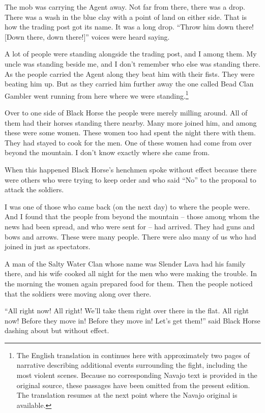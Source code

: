 The mob was carrying the Agent away. Not far from there, there was a drop. There was a wash in the blue clay with a point of land on either side. That is how the trading post got its name. It was a long drop.
``Throw him down there! [Down there, down there!]'' voices were heard saying.

A lot of people were standing alongside the trading post, and I among them. My uncle was standing beside me, and I don't remember who else was standing there. As the people carried the Agent along they beat him with their fists. They were beating him up. But as they carried him further away the one called Bead Clan Gambler went running from here where we were standing.\footnote{The English translation in \citet[27-29]{Young:1952cy} continues here with approximately two pages of narrative describing additional events surrounding the fight, including the most violent scenes. Because no corresponding Navajo text is provided in the original source, these passages have been omitted from the present edition. The translation resumes at the next point where the Navajo original is available.}

Over to one side of Black Horse the people were merely milling around. All of them had their horses standing there nearby. Many more joined him, and among these were some women. These women too had spent the night there with them. They had stayed to cook for the men. One of these women had come from over beyond the mountain. I don't know exactly where she came from.

When this happened Black Horse's henchmen spoke without effect because there were others who were trying to keep order and who said ``No'' to the proposal to attack the soldiers.

I was one of those who came back (on the next day) to where the people were. And I found that the people from beyond the mountain -- those among whom the news had been spread, and who were sent for -- had arrived. They had guns and bows and arrows. These were many people. There were also many of us who had joined in just as spectators.

A man of the Salty Water Clan whose name was Slender Lava had his family there, and his wife cooked all night for the men who were making the trouble. In the morning the women again prepared food for them. Then the people noticed that the soldiers were moving along over there.

``All right now! All right! We'll take them right over there in the flat. All right now! Before they move in! Before they move in! Let's get them!'' said Black Horse dashing about but without effect.

